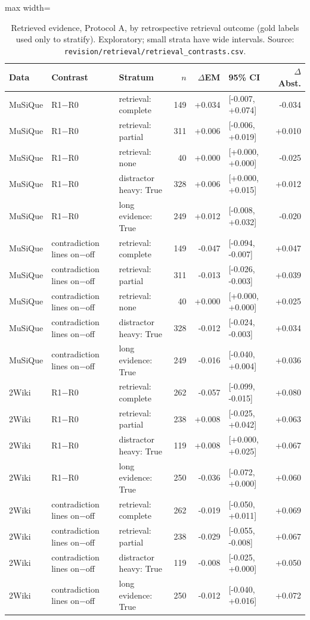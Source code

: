 \begin{table}[t]
\centering
\footnotesize
\begin{adjustbox}{max width=\linewidth}
\begin{tabular}{@{}lllrrlr@{}}
\toprule
Data & Contrast & Stratum & $n$ & $\Delta$EM & 95\% CI & $\Delta$Abst. \\
\midrule
MuSiQue & R1$-$R0 & retrieval: complete & 149 & +0.034 & [-0.007, +0.074] & -0.034 \\
MuSiQue & R1$-$R0 & retrieval: partial & 311 & +0.006 & [-0.006, +0.019] & +0.010 \\
MuSiQue & R1$-$R0 & retrieval: none & 40 & +0.000 & [+0.000, +0.000] & -0.025 \\
MuSiQue & R1$-$R0 & distractor heavy: True & 328 & +0.006 & [+0.000, +0.015] & +0.012 \\
MuSiQue & R1$-$R0 & long evidence: True & 249 & +0.012 & [-0.008, +0.032] & -0.020 \\
MuSiQue & contradiction lines on$-$off & retrieval: complete & 149 & -0.047 & [-0.094, -0.007] & +0.047 \\
MuSiQue & contradiction lines on$-$off & retrieval: partial & 311 & -0.013 & [-0.026, -0.003] & +0.039 \\
MuSiQue & contradiction lines on$-$off & retrieval: none & 40 & +0.000 & [+0.000, +0.000] & +0.025 \\
MuSiQue & contradiction lines on$-$off & distractor heavy: True & 328 & -0.012 & [-0.024, -0.003] & +0.034 \\
MuSiQue & contradiction lines on$-$off & long evidence: True & 249 & -0.016 & [-0.040, +0.004] & +0.036 \\
\midrule
2Wiki & R1$-$R0 & retrieval: complete & 262 & -0.057 & [-0.099, -0.015] & +0.080 \\
2Wiki & R1$-$R0 & retrieval: partial & 238 & +0.008 & [-0.025, +0.042] & +0.063 \\
2Wiki & R1$-$R0 & distractor heavy: True & 119 & +0.008 & [+0.000, +0.025] & +0.067 \\
2Wiki & R1$-$R0 & long evidence: True & 250 & -0.036 & [-0.072, +0.000] & +0.060 \\
2Wiki & contradiction lines on$-$off & retrieval: complete & 262 & -0.019 & [-0.050, +0.011] & +0.069 \\
2Wiki & contradiction lines on$-$off & retrieval: partial & 238 & -0.029 & [-0.055, -0.008] & +0.067 \\
2Wiki & contradiction lines on$-$off & distractor heavy: True & 119 & -0.008 & [-0.025, +0.000] & +0.050 \\
2Wiki & contradiction lines on$-$off & long evidence: True & 250 & -0.012 & [-0.040, +0.016] & +0.072 \\
\bottomrule
\end{tabular}
\end{adjustbox}
\caption{Retrieved evidence, Protocol A, by retrospective retrieval outcome (gold labels used only to stratify). Exploratory; small strata have wide intervals. Source: \texttt{revision/\allowbreak retrieval/\allowbreak retrieval\_contrasts.csv}.}
\label{tab:retrieval-strata}
\end{table}
